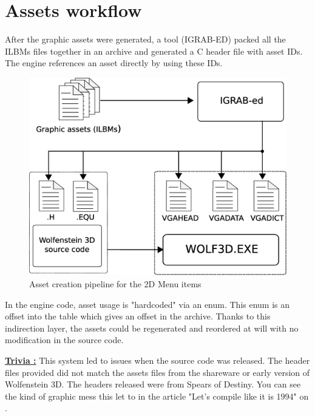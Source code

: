 \documentclass[book.tex]{subfiles}
\begin{document}
\section{Assets workflow}
After the graphic assets were generated, a tool (IGRAB-ED) packed all the ILBMs files together in an archive and generated a C header file with asset IDs. The engine references an asset directly by using these IDs.\\
\begin{figure}[H]
\centering
 \includegraphics[width=\textwidth]{imgs/drawings/drawing_plain.eps}
 \caption{Asset creation pipeline for the 2D Menu items}
\end{figure}
\par
\begin{minipage}{\textwidth}
 \par
 \end{minipage}
 
 In the engine code, asset usage is "hardcoded" via an enum. This enum is an offset into the 
  table which gives an offset in the  archive. Thanks to this indirection layer, the assets could be regenerated and reordered at will with no modification in the source code.\\
 \par
 \begin{minipage}{\textwidth}
 \par
 \end{minipage}
\par
\textbf{\underline{Trivia :}} This system led to issues when the source code was released. The  header files provided did not match the assets files from the shareware or early version of Wolfenstein 3D. The headers released were from Spears of Destiny. You can see the kind of graphic mess this let to in the article "Let's compile like it is 1994" on .\\
\end{document}
